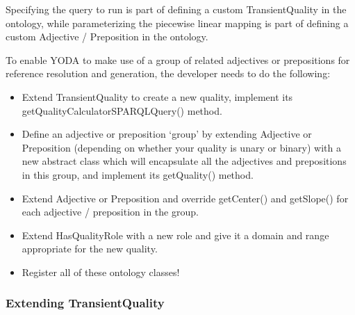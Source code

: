 \documentclass[titlepage]{article}
\begin{document}
Specifying the query to run is part of defining a custom TransientQuality in the ontology, while parameterizing the piecewise linear mapping is part of defining a custom Adjective / Preposition in the ontology.



\noindent To enable YODA to make use of a group of related adjectives or prepositions for reference resolution and generation, the developer needs to do the following:
\begin{itemize}
\item Extend TransientQuality to create a new quality, implement its getQualityCalculatorSPARQLQuery() method.
\item Define an adjective or preposition `group' by extending Adjective or Preposition (depending on whether your quality is unary or binary) with a new abstract class which will encapsulate all the adjectives and prepositions in this group, and implement its getQuality() method.
\item Extend Adjective or Preposition and override getCenter() and getSlope() for each adjective / preposition in the group.
\item Extend HasQualityRole with a new role and give it a domain and range appropriate for the new quality.
\item Register all of these ontology classes!
\end{itemize}


\subsubsection{Extending TransientQuality}
\end{document}
